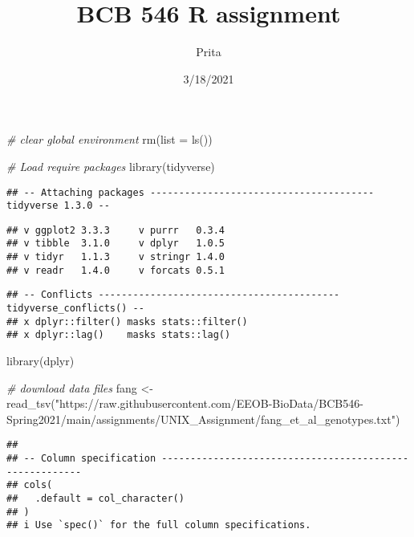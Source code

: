\documentclass[
]{article}
\title{BCB 546 R assignment}
\author{Prita}
\date{3/18/2021}
\newenvironment{Shaded}{\begin{snugshade}}{\end{snugshade}}
\newcommand{\AttributeTok}[1]{\textcolor[rgb]{0.77,0.63,0.00}{#1}}
\newcommand{\CommentTok}[1]{\textcolor[rgb]{0.56,0.35,0.01}{\textit{#1}}}
\newcommand{\FunctionTok}[1]{\textcolor[rgb]{0.00,0.00,0.00}{#1}}
\newcommand{\NormalTok}[1]{#1}
\newcommand{\OtherTok}[1]{\textcolor[rgb]{0.56,0.35,0.01}{#1}}
\newcommand{\StringTok}[1]{\textcolor[rgb]{0.31,0.60,0.02}{#1}}
\begin{document}
\maketitle

\begin{Shaded}
\begin{Highlighting}[]
\CommentTok{\# clear global environment}
\FunctionTok{rm}\NormalTok{(}\AttributeTok{list =} \FunctionTok{ls}\NormalTok{())}

\CommentTok{\# Load require packages}
\FunctionTok{library}\NormalTok{(tidyverse)}
\end{Highlighting}
\end{Shaded}

\begin{verbatim}
## -- Attaching packages --------------------------------------- tidyverse 1.3.0 --
\end{verbatim}

\begin{verbatim}
## v ggplot2 3.3.3     v purrr   0.3.4
## v tibble  3.1.0     v dplyr   1.0.5
## v tidyr   1.1.3     v stringr 1.4.0
## v readr   1.4.0     v forcats 0.5.1
\end{verbatim}

\begin{verbatim}
## -- Conflicts ------------------------------------------ tidyverse_conflicts() --
## x dplyr::filter() masks stats::filter()
## x dplyr::lag()    masks stats::lag()
\end{verbatim}

\begin{Shaded}
\begin{Highlighting}[]
\FunctionTok{library}\NormalTok{(dplyr)}
\end{Highlighting}
\end{Shaded}

\begin{Shaded}
\begin{Highlighting}[]
\CommentTok{\# download data files}
\NormalTok{fang }\OtherTok{\textless{}{-}} \FunctionTok{read\_tsv}\NormalTok{(}\StringTok{"https://raw.githubusercontent.com/EEOB{-}BioData/BCB546{-}Spring2021/main/assignments/UNIX\_Assignment/fang\_et\_al\_genotypes.txt"}\NormalTok{)}
\end{Highlighting}
\end{Shaded}

\begin{verbatim}
## 
## -- Column specification --------------------------------------------------------
## cols(
##   .default = col_character()
## )
## i Use `spec()` for the full column specifications.
\end{verbatim}
\end{document}
